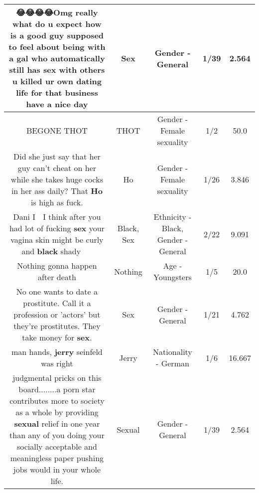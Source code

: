 \documentclass[11pt]{article}
\newlength\mylength
\begin{document}
\begin{center}
\begin{longtable}{|C{.65\mylength}|C{.30\mylength}|C{.12\mylength}|C{.12\mylength}|C{.12\mylength}|}
  \small 😂😂😂😂Omg really what do u expect how is a good guy supposed to feel about being with a gal who automatically still has \textbf{sex} with others u killed ur own dating life for that business have a nice day\normalsize   & Sex & Gender - General & 1/39 & 2.564 \\  \hline
  \small BEGONE THOT\normalsize   & THOT & Gender - Female sexuality & 1/2 & 50.0 \\  \hline
  \small Did she just say that her guy can't cheat on her while she takes huge cocks in her ass daily? That \textbf{Ho} is high as fuck.\normalsize   & Ho & Gender - Female sexuality & 1/26 & 3.846 \\  \hline
  \small Dani I 🤔 I think after you had lot of fucking \textbf{sex} your vagina skin might be curly and \textbf{black} shady 🤣🤣🤣🤣\normalsize   & Black, Sex & Ethnicity - Black, Gender - General & 2/22 & 9.091 \\  \hline
  \small Nothing gonna happen after death\normalsize   & Nothing & Age - Youngsters & 1/5 & 20.0 \\  \hline
  \small No one wants to date a prostitute. Call it a profession or 'actors' but they're prostitutes. They take money for \textbf{sex}.\normalsize   & Sex & Gender - General & 1/21 & 4.762 \\  \hline
  \small man hands, \textbf{jerry} seinfeld was right\normalsize   & Jerry & Nationality - German & 1/6 & 16.667 \\  \hline
  \small judgmental pricks on this board........a porn star contributes more to society as a whole by providing \textbf{sexual} relief in one year  than any of you doing your socially acceptable and meaningless paper pushing jobs would in your whole life.\normalsize   & Sexual & Gender - General & 1/39 & 2.564 \\  \hline

\end{longtable}
\end{center}
\end{document}
